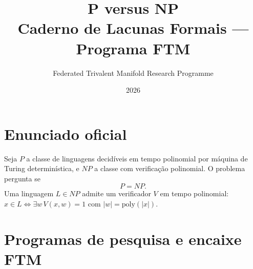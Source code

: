 \documentclass[11pt,a4paper]{article}
\title{P versus NP\\[4pt]
       \large Caderno de Lacunas Formais — Programa FTM}
\author{Federated Trivalent Manifold Research Programme}
\date{2026}
\begin{document}
\maketitle
\tableofcontents
\bigskip

\section{Enunciado oficial}

\begin{definition}[P versus NP]
Seja $P$ a classe de linguagens decidíveis em tempo polinomial
por máquina de Turing determinística, e $NP$ a classe com
verificação polinomial. O problema pergunta se
\[
  P = NP.
\]
Uma linguagem $L\in NP$ admite um verificador $V$ em tempo
polinomial: $x\in L \Leftrightarrow \exists w\,V(x,w)=1$
com $|w|=\mathrm{poly}(|x|)$.
\end{definition}

\bigskip

\section{Programas de pesquisa e encaixe FTM}
\end{document}
